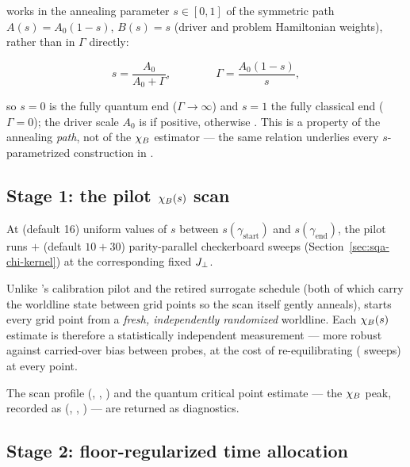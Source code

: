  works in the annealing parameter $s\in[0,1]$ of the
symmetric path $A(s)=A_0(1-s)$, $B(s)=s$ (driver and problem Hamiltonian
weights), rather than in $\Gamma$ directly:
\begin{keyeq}
\begin{equation}
s=\frac{A_0}{A_0+\Gamma},
\qquad\qquad
\Gamma=\frac{A_0(1-s)}{s},
\label{eq:sqa-chi-s}
\end{equation}
\end{keyeq}
so $s=0$ is the fully quantum end ($\Gamma\to\infty$) and $s=1$ the fully
classical end ($\Gamma=0$); the driver scale $A_0$ is 
if positive, otherwise . This is a property of the
annealing \emph{path}, not of the $\chi_B$ estimator --- the same relation
underlies every $s$-parametrized construction in \qv.

\subsection{Stage 1: the pilot \texorpdfstring{$\chi_B(s)$}{chi\_B(s)} scan}

At  (default 16) uniform values of $s$ between
$s(\gamma_{\mathrm{start}})$ and $s(\gamma_{\mathrm{end}})$, the pilot runs
$+$ (default $10+30$) parity-parallel
checkerboard sweeps (Section~\ref{sec:sqa-chi-kernel}) at the corresponding
fixed $J_{\perp}$.

\begin{warnbox}
Unlike 's calibration pilot and the retired surrogate
schedule (both of which carry the worldline state between grid points so
the scan itself gently anneals),  starts every grid point
from a \emph{fresh, independently randomized} worldline. Each $\chi_B(s)$
estimate is therefore a statistically independent measurement --- more
robust against carried-over bias between probes, at the cost of
re-equilibrating ( sweeps) at every point.
\end{warnbox}

The scan profile (, , )
and the quantum critical point estimate --- the $\chi_B$ peak, recorded as
(, , ) --- are returned
as diagnostics.

\subsection{Stage 2: floor-regularized time allocation}

